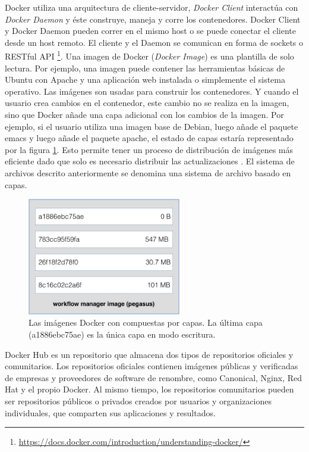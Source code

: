 Docker utiliza una arquitectura de cliente-servidor, \emph{Docker Client} interactúa con \emph{Docker Daemon} y éste construye, maneja y corre los contenedores. Docker Client y Docker Daemon pueden correr en el mismo host o se puede conectar el cliente desde un host remoto. El cliente y el Daemon se comunican en forma de sockets o RESTful API \footnote{\url{https://docs.docker.com/introduction/understanding-docker/}}. 
Una imagen de Docker (\textit{Docker Image}) es una plantilla de solo lectura. Por ejemplo, una imagen puede contener las herramientas básicas de Ubuntu con Apache y una aplicación web instalada o simplemente el sistema operativo. Las imágenes son usadas para construir los contenedores. Y cuando el usuario crea cambios en el contenedor, este cambio no se realiza en la imagen, sino  que Docker añade una capa adicional con los cambios de la imagen\cite{bui2015analysis}. Por ejemplo, si el usuario utiliza una imagen base de Debian, luego añade el paquete emacs y luego añade el paquete apache, el estado de capas estaría representado por la figura \ref{fig:arquitectura}. Esto permite tener un proceso de distribución de imágenes más eficiente dado que solo es necesario distribuir las actualizaciones \cite{bui2015analysis}. El sistema de archivos descrito anteriormente se denomina una sistema de archivo basado en capas.
\begin{figure}[t]
  \centering
  \includegraphics[width=0.6\textwidth]{Figures/docker-filesystems-multilayer}
    \caption[Capas de una imagen de Docker]{Las imágenes Docker con compuestas por capas. 
    La última capa (a1886ebc75ae) es la única capa en modo escritura.}
    \label{fig:arquitectura}
\end{figure}	

Docker Hub es un repositorio que almacena dos tipos de repositorios oficiales y comunitarios. Los repositorios oficiales contienen imágenes públicas y verificadas de empresas y proveedores de software de renombre, como Canonical, Nginx, Red Hat y el propio Docker. Al mismo tiempo, los repositorios comunitarios pueden ser repositorios públicos o privados creados por usuarios y organizaciones individuales, que comparten sus aplicaciones y resultados. 

